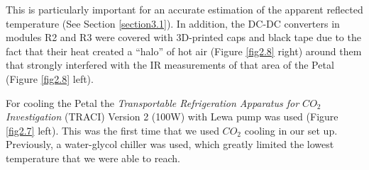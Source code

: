 		This is particularly important for an accurate estimation of the apparent reflected temperature (See Section \ref{section3.1}). In addition, the DC-DC converters in modules R2 and R3 were covered with 3D-printed caps and black tape due to the fact that their heat created a “halo” of hot air (Figure \ref{fig2.8} right) around them that strongly interfered with the IR measurements of that area of the Petal (Figure \ref{fig2.8} left).
		
		For cooling the Petal the \textit{Transportable Refrigeration Apparatus for $CO_{2}$ Investigation} (TRACI) Version 2 (100W) with Lewa pump was used (Figure \ref{fig2.7} left). This was the first time that we used $CO_{2}$ cooling in our set up. Previously, a water-glycol chiller was used, which greatly limited the lowest temperature that we were able to reach.
	
